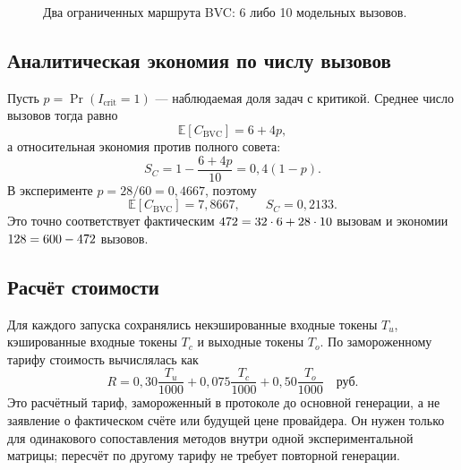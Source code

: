 \documentclass[11pt]{article}
\begin{document}
\begin{figure}[H]
\centering
{}
\caption{Два ограниченных маршрута BVC: 6 либо 10 модельных вызовов.}
\label{fig:bvc-flow}
\end{figure}

\subsection{Аналитическая экономия по числу вызовов}

Пусть \(p=\Pr(I_{\mathrm{crit}}=1)\) --- наблюдаемая доля задач с критикой.
Среднее число вызовов тогда равно
\[
\mathbb{E}[C_{\mathrm{BVC}}]=6+4p,
\]
а относительная экономия против полного совета:
\[
S_C = 1-\frac{6+4p}{10}=0{,}4(1-p).
\]
В эксперименте \(p=28/60=0{,}4667\), поэтому
\[
\mathbb{E}[C_{\mathrm{BVC}}]=7{,}8667,\qquad
S_C=0{,}2133.
\]
Это точно соответствует фактическим \(472=32\cdot6+28\cdot10\)
вызовам и экономии \(128=600-472\) вызовов.

\subsection{Расчёт стоимости}

Для каждого запуска сохранялись некэшированные входные токены
\(T_u\), кэшированные входные токены \(T_c\) и выходные токены \(T_o\).
По замороженному тарифу стоимость вычислялась как
\[
R =
0{,}30\frac{T_u}{1000}
+0{,}075\frac{T_c}{1000}
+0{,}50\frac{T_o}{1000}\quad\text{руб.}
\]
Это расчётный тариф, замороженный в протоколе до основной генерации, а не
заявление о фактическом счёте или будущей цене провайдера. Он нужен только для
одинакового сопоставления методов внутри одной экспериментальной матрицы;
пересчёт по другому тарифу не требует повторной генерации.
\end{document}

